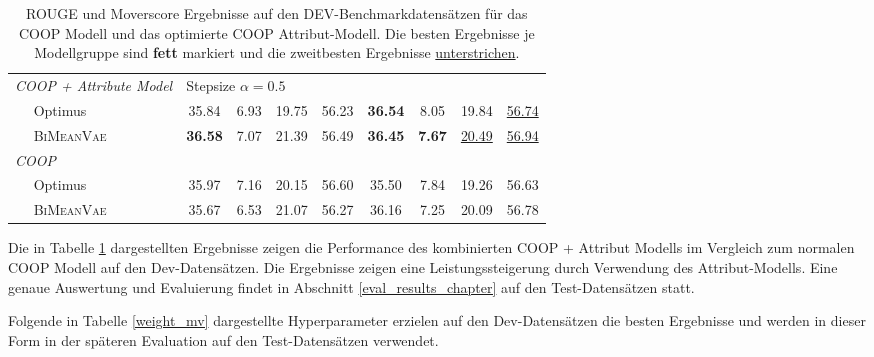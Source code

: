 \begin{table}[!h]
\begin{tabular}{@{}lcccc|cccc@{}}
    \textit{COOP + Attribute Model}        &    \multicolumn{3}{l}{Stepsize $\alpha= 0.5$}            &        &   & &     \\
    $\quad$ Optimus            & 35.84  &6.93 & 19.75& 56.23&   \textbf{36.54}  &   8.05   &19.84   & \underline{56.74}  \\ 
    $\quad$ \textsc{BiMeanVae}& \textbf{36.58} & 7.07 & 21.39 & 56.49 & \textbf{36.45} & \textbf{7.67} & \underline{20.49}& \underline{56.94} \\ \midrule %

    \textit{COOP}              &         &         &        &        &        & &   &    \\
    $\quad$ Optimus        & 35.97 & 7.16 & 20.15 & 56.60 & 35.50  & 7.84  & 19.26 & 56.63\\  %
    $\quad$ \textsc{BiMeanVae} &  35.67 &6.53 & 21.07 & 56.27 & 36.16 & 7.25 & 20.09 & 56.78\\ 
    
    	\bottomrule
    
    \end{tabular}
    \caption{ROUGE und Moverscore Ergebnisse auf den DEV-Benchmarkdatensätzen für das COOP Modell und das optimierte COOP Attribut-Modell. Die besten Ergebnisse je Modellgruppe sind \textbf{fett} markiert und die zweitbesten Ergebnisse \underline{unterstrichen}.
    }
    \label{dev_eval_results}
\end{table}

Die in Tabelle \ref{dev_eval_results} dargestellten Ergebnisse zeigen die Performance des kombinierten COOP + Attribut Modells im Vergleich zum normalen COOP Modell auf den Dev-Datensätzen.
Die Ergebnisse zeigen eine Leistungssteigerung durch Verwendung des Attribut-Modells. Eine genaue Auswertung und Evaluierung findet in Abschnitt \ref{eval_results_chapter} auf den Test-Datensätzen statt.

\pagebreak
Folgende in Tabelle \ref{weight_mv} dargestellte Hyperparameter erzielen auf den Dev-Datensätzen die besten Ergebnisse und werden in dieser Form in der späteren Evaluation auf den Test-Datensätzen verwendet.

